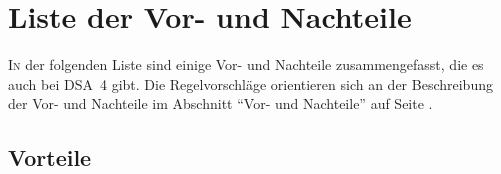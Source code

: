 \BN
\chapter{Liste der Vor- und Nachteile} \label{Ch:VorNachteile}  

\lettrine{I}{n} der folgenden Liste sind einige Vor- und Nachteile zusammengefasst, die es auch bei DSA~4 gibt. Die Regelvorschläge orientieren sich an der Beschreibung der Vor- und Nachteile im Abschnitt "`Vor- und Nachteile"' auf Seite \pageref{VorUndNachteile}.

\section{Vorteile}

